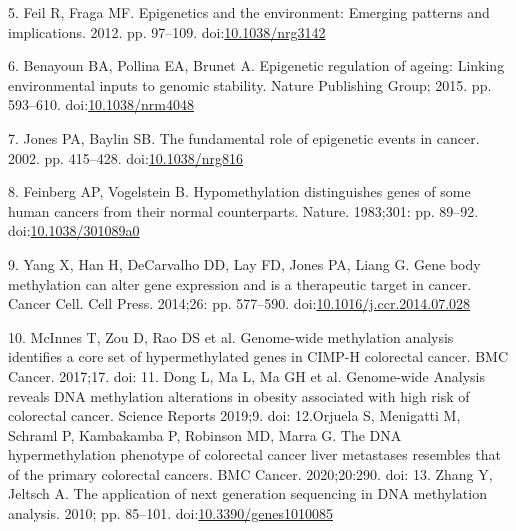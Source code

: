 \documentclass[10pt,letterpaper]{article}
\begin{document}
\leavevmode\hypertarget{ref-Feil2012}{}%
5. Feil R, Fraga MF. Epigenetics and the environment: Emerging patterns
and implications. 2012. pp. 97--109.
doi:\href{https://doi.org/10.1038/nrg3142}{10.1038/nrg3142}

\leavevmode\hypertarget{ref-Benayoun2015}{}%
6. Benayoun BA, Pollina EA, Brunet A. Epigenetic regulation of ageing:
Linking environmental inputs to genomic stability. Nature Publishing
Group; 2015. pp. 593--610.
doi:\href{https://doi.org/10.1038/nrm4048}{10.1038/nrm4048}

\leavevmode\hypertarget{ref-Jones2002}{}%
7. Jones PA, Baylin SB. The fundamental role of epigenetic events in
cancer. 2002. pp. 415--428.
doi:\href{https://doi.org/10.1038/nrg816}{10.1038/nrg816}

\leavevmode\hypertarget{ref-Feinberg1983}{}%
8. Feinberg AP, Vogelstein B. Hypomethylation distinguishes genes of
some human cancers from their normal counterparts. Nature. 1983;301:
pp. 89--92. 
doi:\href{https://doi.org/10.1038/301089a0}{10.1038/301089a0}

\leavevmode\hypertarget{ref-Yang2014}{}%
9. Yang X, Han H, DeCarvalho DD, Lay FD, Jones PA, Liang G. Gene body
methylation can alter gene expression and is a therapeutic target in
cancer. Cancer Cell. Cell Press. 2014;26: pp. 577--590.
doi:\href{https://doi.org/10.1016/j.ccr.2014.07.028}{10.1016/j.ccr.2014.07.028}

\leavevmode\hypertarget{ref-McInnes2017}{}%
10. McInnes T, Zou D, Rao DS et al. Genome-wide methylation analysis identifies 
a core set of hypermethylated genes in CIMP-H colorectal cancer. BMC Cancer. 
2017;17. doi:\href{https://doi.org/10.1186/s12885-017-3226-4}

\leavevmode\hypertarget{ref-Dong2019}{}%
11. Dong L, Ma L, Ma GH et al. Genome-wide Analysis reveals DNA methylation 
alterations in obesity associated with high risk of colorectal cancer. Science 
Reports 2019;9. doi:\href{https://doi.org/10.1038/s41598-019-41616-0}

\leavevmode\hypertarget{ref-Orjuela2020}{}%
12.Orjuela S, Menigatti M, Schraml P, Kambakamba P, Robinson MD, Marra G. 
The DNA hypermethylation phenotype of colorectal cancer liver metastases
resembles that of the primary colorectal cancers. BMC Cancer. 2020;20:290. 
doi:\href{10.1186/s12885-020-06777-6}

\leavevmode\hypertarget{ref-Zhang2010}{}%
13. Zhang Y, Jeltsch A. The application of next generation sequencing in
DNA methylation analysis. 2010; pp. 85--101.
doi:\href{https://doi.org/10.3390/genes1010085}{10.3390/genes1010085}
\end{document}
